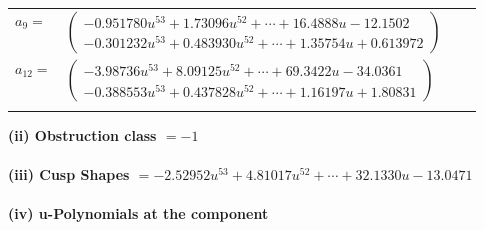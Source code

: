 \documentclass[1p]{elsarticle_modified}
\theoremstyle{definition}
\begin{document}
\begin{tabular}{m{7pt} m{180pt} m{7pt} m{180pt} }
\flushright $a_{9}=$&$\begin{pmatrix}-0.951780 u^{53}+1.73096 u^{52}+\cdots+16.4888 u-12.1502\\-0.301232 u^{53}+0.483930 u^{52}+\cdots+1.35754 u+0.613972\end{pmatrix}$ \\
\flushright $a_{12}=$&$\begin{pmatrix}-3.98736 u^{53}+8.09125 u^{52}+\cdots+69.3422 u-34.0361\\-0.388553 u^{53}+0.437828 u^{52}+\cdots+1.16197 u+1.80831\end{pmatrix}$\\&\end{tabular}
\flushleft \textbf{(ii) Obstruction class $= -1$}\\~\\
\flushleft \textbf{(iii) Cusp Shapes $= -2.52952 u^{53}+4.81017 u^{52}+\cdots+32.1330 u-13.0471$}\\~\\
\newpage\renewcommand{\arraystretch}{1}
\flushleft \textbf{(iv) u-Polynomials at the component}\newline \\
\end{document}
